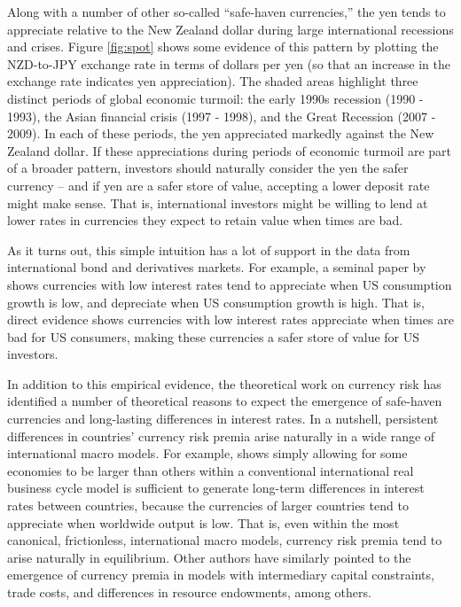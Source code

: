 \documentclass{ar-1col}
\begin{document}
Along with a number of other so-called ``safe-haven currencies,'' the yen tends to appreciate relative to the New Zealand dollar during large international recessions and crises. Figure \ref{fig:spot} shows some evidence of this pattern by plotting the NZD-to-JPY exchange rate in terms of dollars per yen (so that an increase in the exchange rate indicates yen appreciation). The shaded areas highlight three distinct periods of global economic turmoil: the early 1990s recession (1990 - 1993), the Asian financial crisis (1997 - 1998), and the Great Recession (2007 - 2009). In each of these periods, the yen appreciated markedly against the New Zealand dollar. If these appreciations during periods of economic turmoil are part of a broader pattern, investors should naturally consider the yen the safer currency -- and if yen are a safer store of value, accepting a lower deposit rate might make sense. That is, international investors might be willing to lend at lower rates in currencies they expect to retain value when times are bad.

As it turns out, this simple intuition has a lot of support in the data from international bond and derivatives markets. For example, a seminal paper by \citet{LustigVerdelhan2007} shows currencies with low interest rates tend to appreciate when US consumption growth is low, and depreciate when US consumption growth is high. That is, direct evidence shows currencies with low interest rates appreciate when times are bad for US consumers, making these currencies a safer store of value for US investors.

In addition to this empirical evidence, the theoretical work on currency risk has identified a number of theoretical reasons to expect the emergence of safe-haven currencies and long-lasting differences in interest rates. In a nutshell, persistent differences in countries' currency risk premia arise naturally in a wide range of international macro models. For example, \citet{Hassan2013} shows simply allowing for some economies to be larger than others within a conventional international real business cycle model is sufficient to generate long-term differences in interest rates between countries, because the currencies of larger countries tend to appreciate when worldwide output is low. That is, even within the most canonical, frictionless, international macro models, currency risk premia tend to arise naturally in equilibrium. Other authors have similarly pointed to the emergence of currency premia in models with intermediary capital constraints, trade costs, and differences in resource endowments, among others.
\end{document}
